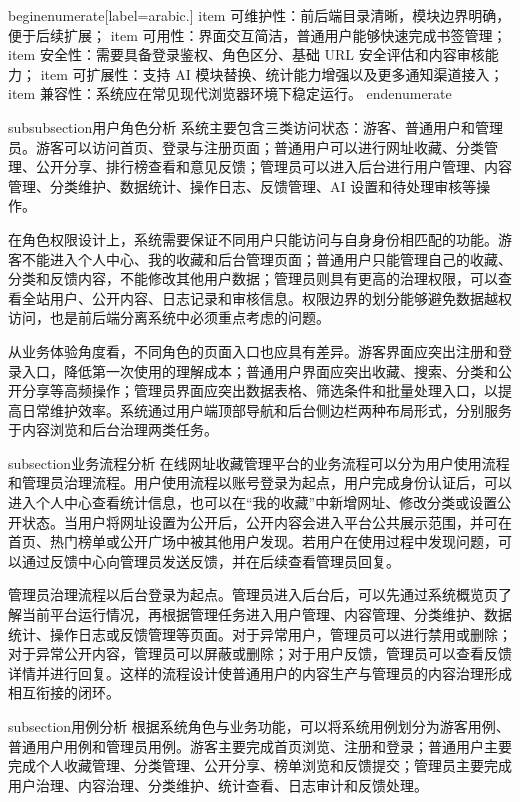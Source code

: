 begin{enumerate}[label=arabic.]
    item 可维护性：前后端目录清晰，模块边界明确，便于后续扩展；
    item 可用性：界面交互简洁，普通用户能够快速完成书签管理；
    item 安全性：需要具备登录鉴权、角色区分、基础 URL 安全评估和内容审核能力；
    item 可扩展性：支持 AI 模块替换、统计能力增强以及更多通知渠道接入；
    item 兼容性：系统应在常见现代浏览器环境下稳定运行。
end{enumerate}

subsubsection{用户角色分析}
系统主要包含三类访问状态：游客、普通用户和管理员。游客可以访问首页、登录与注册页面；普通用户可以进行网址收藏、分类管理、公开分享、排行榜查看和意见反馈；管理员可以进入后台进行用户管理、内容管理、分类维护、数据统计、操作日志、反馈管理、AI 设置和待处理审核等操作。

在角色权限设计上，系统需要保证不同用户只能访问与自身身份相匹配的功能。游客不能进入个人中心、我的收藏和后台管理页面；普通用户只能管理自己的收藏、分类和反馈内容，不能修改其他用户数据；管理员则具有更高的治理权限，可以查看全站用户、公开内容、日志记录和审核信息。权限边界的划分能够避免数据越权访问，也是前后端分离系统中必须重点考虑的问题。

从业务体验角度看，不同角色的页面入口也应具有差异。游客界面应突出注册和登录入口，降低第一次使用的理解成本；普通用户界面应突出收藏、搜索、分类和公开分享等高频操作；管理员界面应突出数据表格、筛选条件和批量处理入口，以提高日常维护效率。系统通过用户端顶部导航和后台侧边栏两种布局形式，分别服务于内容浏览和后台治理两类任务。


subsection{业务流程分析}
在线网址收藏管理平台的业务流程可以分为用户使用流程和管理员治理流程。用户使用流程以账号登录为起点，用户完成身份认证后，可以进入个人中心查看统计信息，也可以在“我的收藏”中新增网址、修改分类或设置公开状态。当用户将网址设置为公开后，公开内容会进入平台公共展示范围，并可在首页、热门榜单或公开广场中被其他用户发现。若用户在使用过程中发现问题，可以通过反馈中心向管理员发送反馈，并在后续查看管理员回复。

管理员治理流程以后台登录为起点。管理员进入后台后，可以先通过系统概览页了解当前平台运行情况，再根据管理任务进入用户管理、内容管理、分类维护、数据统计、操作日志或反馈管理等页面。对于异常用户，管理员可以进行禁用或删除；对于异常公开内容，管理员可以屏蔽或删除；对于用户反馈，管理员可以查看反馈详情并进行回复。这样的流程设计使普通用户的内容生产与管理员的内容治理形成相互衔接的闭环。

subsection{用例分析}
根据系统角色与业务功能，可以将系统用例划分为游客用例、普通用户用例和管理员用例。游客主要完成首页浏览、注册和登录；普通用户主要完成个人收藏管理、分类管理、公开分享、榜单浏览和反馈提交；管理员主要完成用户治理、内容治理、分类维护、统计查看、日志审计和反馈处理。

